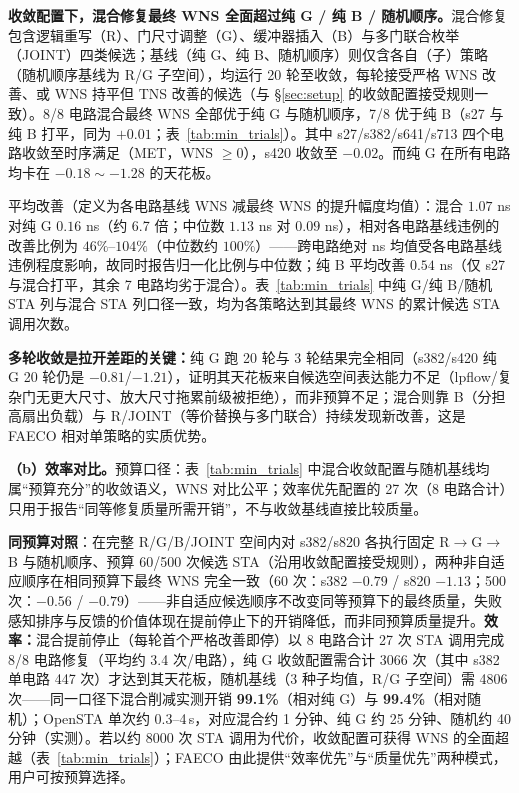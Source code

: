 \documentclass[journal]{IEEEtran}
\begin{document}
\textbf{收敛配置下，混合修复最终 WNS 全面超过纯 G / 纯 B / 随机顺序。}混合修复包含逻辑重写（R）、门尺寸调整（G）、缓冲器插入（B）与多门联合枚举（JOINT）四类候选；基线（纯 G、纯 B、随机顺序）则仅含各自（子）策略（随机顺序基线为 R/G 子空间），均运行 20 轮至收敛，每轮接受严格 WNS 改善、或 WNS 持平但 TNS 改善的候选（与 \S\ref{sec:setup} 的收敛配置接受规则一致）。8/8 电路混合最终 WNS 全部优于纯 G 与随机顺序，7/8 优于纯 B（s27 与纯 B 打平，同为 $+0.01$；表~\ref{tab:min_trials}）。其中 s27/s382/s641/s713 四个电路收敛至时序满足（MET，WNS $\ge 0$），s420 收敛至 $-0.02$。而纯 G 在所有电路均卡在 $-0.18\sim-1.28$ 的天花板。

平均改善（定义为各电路基线 WNS 减最终 WNS 的提升幅度均值）：混合 $1.07$ ns 对纯 G $0.16$ ns（约 6.7 倍；中位数 $1.13$ ns 对 $0.09$ ns），相对各电路基线违例的改善比例为 $46\%$--$104\%$（中位数约 $100\%$）——跨电路绝对 ns 均值受各电路基线违例程度影响，故同时报告归一化比例与中位数；纯 B 平均改善 $0.54$ ns（仅 s27 与混合打平，其余 7 电路均劣于混合）。表~\ref{tab:min_trials} 中纯 G/纯 B/随机 STA 列与混合 STA 列口径一致，均为各策略达到其最终 WNS 的累计候选 STA 调用次数。

\textbf{多轮收敛是拉开差距的关键：}纯 G 跑 20 轮与 3 轮结果完全相同（s382/s420 纯 G 20 轮仍是 $-0.81$/$-1.21$），证明其天花板来自候选空间表达能力不足（lpflow/复杂门无更大尺寸、放大尺寸拖累前级被拒绝），而非预算不足；混合则靠 B（分担高扇出负载）与 R/JOINT（等价替换与多门联合）持续发现新改善，这是 FAECO 相对单策略的实质优势。

\textbf{（b）效率对比。}预算口径：表~\ref{tab:min_trials} 中混合收敛配置与随机基线均属“预算充分”的收敛语义，WNS 对比公平；效率优先配置的 27 次（8 电路合计）只用于报告“同等修复质量所需开销”，不与收敛基线直接比较质量。

\textbf{同预算对照}：在完整 R/G/B/JOINT 空间内对 s382/s820 各执行固定 R$\rightarrow$G$\rightarrow$B 与随机顺序、预算 60/500 次候选 STA（沿用收敛配置接受规则），两种非自适应顺序在相同预算下最终 WNS 完全一致（60 次：s382 $-0.79$ / s820 $-1.13$；500 次：$-0.56$ / $-0.79$）——非自适应候选顺序不改变同等预算下的最终质量，失败感知排序与反馈的价值体现在提前停止下的开销降低，而非同预算质量提升。\textbf{效率：}混合提前停止（每轮首个严格改善即停）以 8 电路合计 27 次 STA 调用完成 8/8 电路修复（平均约 3.4 次/电路），纯 G 收敛配置需合计 3066 次（其中 s382 单电路 447 次）才达到其天花板，随机基线（3 种子均值，R/G 子空间）需 4806 次——同一口径下混合削减实测开销 \textbf{99.1\%}（相对纯 G）与 \textbf{99.4\%}（相对随机）；OpenSTA 单次约 0.3--4\,s，对应混合约 1 分钟、纯 G 约 25 分钟、随机约 40 分钟（实测）。若以约 8000 次 STA 调用为代价，收敛配置可获得 WNS 的全面超越（表~\ref{tab:min_trials}）；FAECO 由此提供“效率优先”与“质量优先”两种模式，用户可按预算选择。
\end{document}
